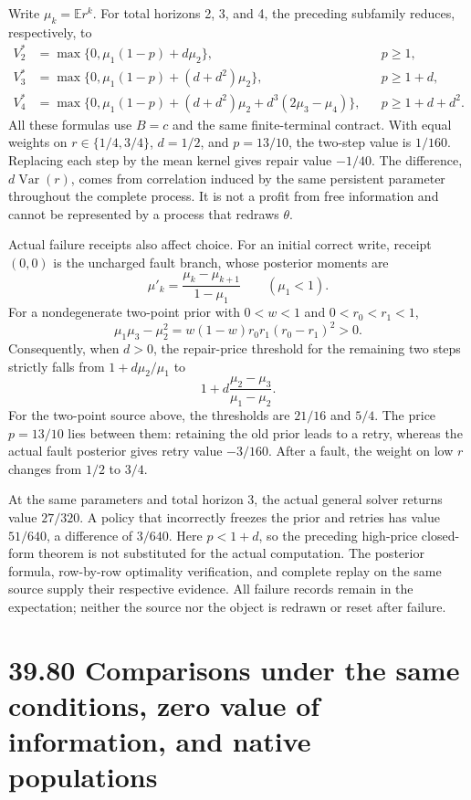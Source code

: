 \documentclass[
  english,
  11pt,
  oneside]{book}
\begin{document}
Write \(\mu_k=\mathbb E r^k\). For total horizons 2, 3, and 4, the preceding subfamily reduces, respectively, to \[\begin{aligned}
V_2^*&=\max\{0,\mu_1(1-p)+d\mu_2\},&&p\ge1,\\
V_3^*&=\max\{0,\mu_1(1-p)+(d+d^2)\mu_2\},&&p\ge1+d,\\
V_4^*&=\max\{0,\mu_1(1-p)+(d+d^2)\mu_2
             +d^3(2\mu_3-\mu_4)\},&&p\ge1+d+d^2.
\end{aligned}\] All these formulas use \(B=c\) and the same finite-terminal contract. With equal weights on \(r\in\{1/4,3/4\}\), \(d=1/2\), and \(p=13/10\), the two-step value is \(1/160\). Replacing each step by the mean kernel gives repair value \(-1/40\). The difference, \(d\operatorname{Var}(r)\), comes from correlation induced by the same persistent parameter throughout the complete process. It is not a profit from free information and cannot be represented by a process that redraws \(\theta\).

Actual failure receipts also affect choice. For an initial correct write, receipt \((0,0)\) is the uncharged fault branch, whose posterior moments are \[\mu'_k=\frac{\mu_k-\mu_{k+1}}{1-\mu_1}
\qquad(\mu_1<1).\] For a nondegenerate two-point prior with \(0<w<1\) and \(0<r_0<r_1<1\), \[\mu_1\mu_3-\mu_2^2=w(1-w)r_0r_1(r_0-r_1)^2>0.\] Consequently, when \(d>0\), the repair-price threshold for the remaining two steps strictly falls from \(1+d\mu_2/\mu_1\) to \[1+d\frac{\mu_2-\mu_3}{\mu_1-\mu_2}.\] For the two-point source above, the thresholds are \(21/16\) and \(5/4\). The price \(p=13/10\) lies between them: retaining the old prior leads to a retry, whereas the actual fault posterior gives retry value \(-3/160\). After a fault, the weight on low \(r\) changes from \(1/2\) to \(3/4\).

At the same parameters and total horizon 3, the actual general solver returns value \(27/320\). A policy that incorrectly freezes the prior and retries has value \(51/640\), a difference of \(3/640\). Here \(p<1+d\), so the preceding high-price closed-form theorem is not substituted for the actual computation. The posterior formula, row-by-row optimality verification, and complete replay on the same source supply their respective evidence. All failure records remain in the expectation; neither the source nor the object is redrawn or reset after failure.

\section{39.80 Comparisons under the same conditions, zero value of information, and native populations}\label{comparisons-under-the-same-conditions-zero-value-of-information-and-native-populations}
\end{document}
